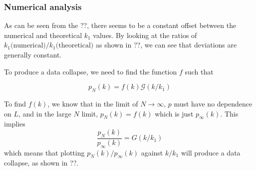 \subsubsection{Numerical analysis}\label{subsection:pa-numerical-largest-degree}

As can be seen from the ??, there seems to be a constant offset between the numerical and theoretical $k_1$ values. By looking at the ratios of $ k_1 \text{(numerical)} / k_1 \text{(theoretical)} $ as shown in ??, we can see that deviations are generally constant. 

To produce a data collapse, we need to find the function $f$ such that 

\begin{equation}
	p_N(k) = f(k) \mathcal{G}\left ( k / k_1 \right )
	\label{eq:data-collapse}
\end{equation}

To find $f(k)$, we know that in the limit of $N \rightarrow \infty$, $p$ must have no dependence on $L$, and in the large $N$ limit, $p_N(k) = f(k)$ which is just $p_{\infty}(k)$. This implies 
\begin{equation}
	\frac{p_N(k)}{p_{\infty}(k)} = G \left ( k / k_1 \right )
\end{equation}
which means that plotting $p_N(k) / p_{\infty}(k)$ against $k / k_1$ will produce a data collapse, as shown in ??. 
